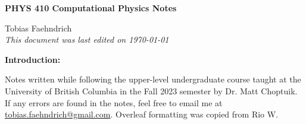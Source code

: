 \documentclass[10pt]{article}
\begin{document}
\begin{tcolorbox}
  \begin{center}
  \begin{Large}
    \textbf{PHYS 410 Computational Physics Notes} \\
    \vspace{5pt}
  \end{Large}
  \begin{large}
        Tobias Faehndrich \\
\vspace{5pt}
    \emph{This document was last edited on \today}
  \end{large}
  \end{center}
\end{tcolorbox}

\begin{center}
  \textbf{Introduction:}

Notes written while following the upper-level undergraduate course taught at the University of British Columbia in the Fall 2023 semester by Dr. Matt Choptuik. If any errors are found in the notes, feel free to email me at \href{mailto:tobias.faehndrich@gmail.com}{tobias.faehndrich@gmail.com}. Overleaf formatting was copied from Rio W.

\end{center}
\tableofcontents

\newpage


\newpage



\newpage


\newpage



\newpage



\newpage


\newpage


\newpage


\newpage


\newpage


\newpage


\newpage


\newpage

\end{document}
